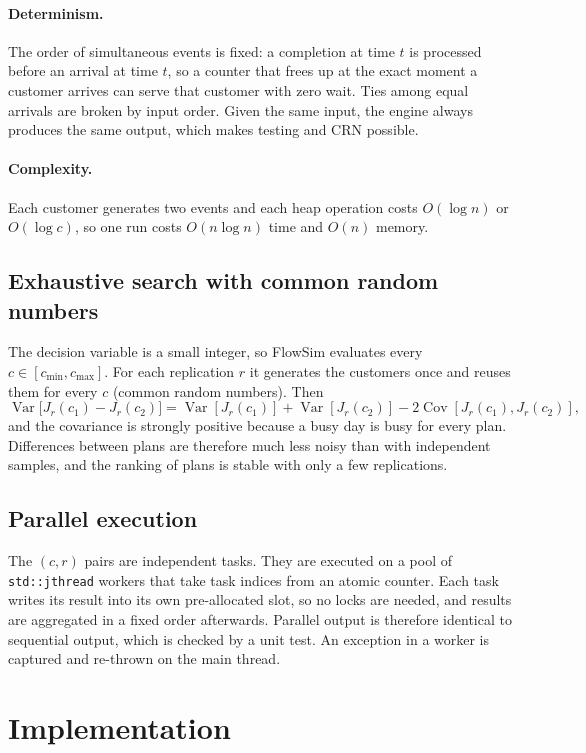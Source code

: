 \documentclass[11pt,a4paper]{article}
\newcommand{\code}[1]{\texttt{#1}}
\begin{document}
\paragraph{Determinism.} The order of simultaneous events is fixed: a completion at time $t$ is processed before an
arrival at time $t$, so a counter that frees up at the exact moment a customer arrives can serve that customer with zero
wait. Ties among equal arrivals are broken by input order. Given the same input, the engine always produces the same
output, which makes testing and CRN possible.

\paragraph{Complexity.} Each customer generates two events and each heap operation costs $O(\log n)$ or $O(\log c)$,
so one run costs $O(n\log n)$ time and $O(n)$ memory.

\subsection{Exhaustive search with common random numbers}
The decision variable is a small integer, so FlowSim evaluates every $c\in[c_{\min},c_{\max}]$. For each replication
$r$ it generates the customers once and reuses them for every $c$ (common random numbers). Then
\[
  \operatorname{Var}\bigl[J_r(c_1)-J_r(c_2)\bigr]
  = \operatorname{Var}[J_r(c_1)] + \operatorname{Var}[J_r(c_2)] - 2\operatorname{Cov}[J_r(c_1),J_r(c_2)],
\]
and the covariance is strongly positive because a busy day is busy for every plan. Differences between plans are
therefore much less noisy than with independent samples, and the ranking of plans is stable with only a few
replications.

\subsection{Parallel execution}
The $(c,r)$ pairs are independent tasks. They are executed on a pool of \code{std::jthread} workers that take task
indices from an atomic counter. Each task writes its result into its own pre-allocated slot, so no locks are needed, and
results are aggregated in a fixed order afterwards. Parallel output is therefore identical to sequential output, which
is checked by a unit test. An exception in a worker is captured and re-thrown on the main thread.

\section{Implementation}
\end{document}
